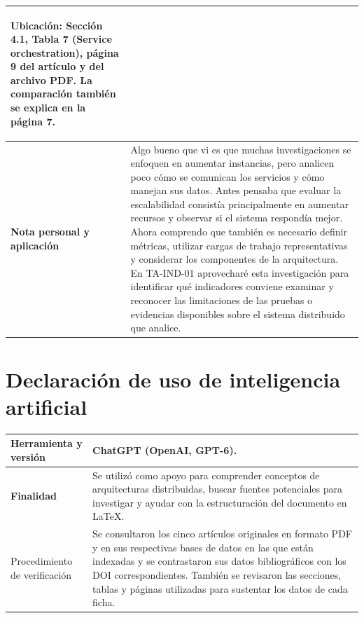 \documentclass[11pt,a4paper]{article}
\begin{document}
\begin{longtable}{
|>{\raggedright\arraybackslash\bfseries}p{3.4cm}
|>{\raggedright\arraybackslash}p{11.6cm}|
}
\par\smallskip

\textbf{Ubicación:}
Sección 4.1, Tabla 7
(Service orchestration),
página 9 del artículo y del archivo PDF.
La comparación también se explica en
la página 7.
\\
\hline


Nota personal y aplicación
&
Algo bueno que vi es que muchas investigaciones se enfoquen en aumentar instancias, pero analicen poco cómo se comunican los servicios y cómo manejan sus datos. Antes pensaba que evaluar la escalabilidad consistía principalmente en aumentar recursos y observar si el sistema respondía mejor. Ahora comprendo que también es necesario definir métricas, utilizar cargas de trabajo representativas y considerar los componentes de la arquitectura. En TA-IND-01 aprovecharé esta investigación para identificar qué indicadores conviene examinar y reconocer las limitaciones de las pruebas o evidencias disponibles sobre el sistema distribuido que analice.
\\
\hline

\end{longtable}

\clearpage


\clearpage

\section*{Declaración de uso de
inteligencia artificial}

\begin{longtable}{
|>{\raggedright\arraybackslash\bfseries}p{3.4cm}
|>{\raggedright\arraybackslash}p{11.6cm}|
}

\hline

Herramienta y versión
&
ChatGPT (OpenAI, GPT-6).
\\
\hline

Finalidad
&
Se utilizó como apoyo para comprender conceptos de arquitecturas distribuidas, buscar fuentes potenciales para investigar y ayudar con la estructuración del documento en LaTeX.
\\
\hline

Procedimiento de verificación
&
Se consultaron los cinco artículos originales en formato PDF y en sus respectivas bases de datos en las que están indexadas y se
contrastaron sus datos bibliográficos con los DOI correspondientes. También se revisaron las secciones, tablas y páginas utilizadas para
sustentar los datos de cada ficha.
\\
\hline

\end{longtable}


\printbibliography[
title={Referencias bibliográficas}
]
\end{document}

